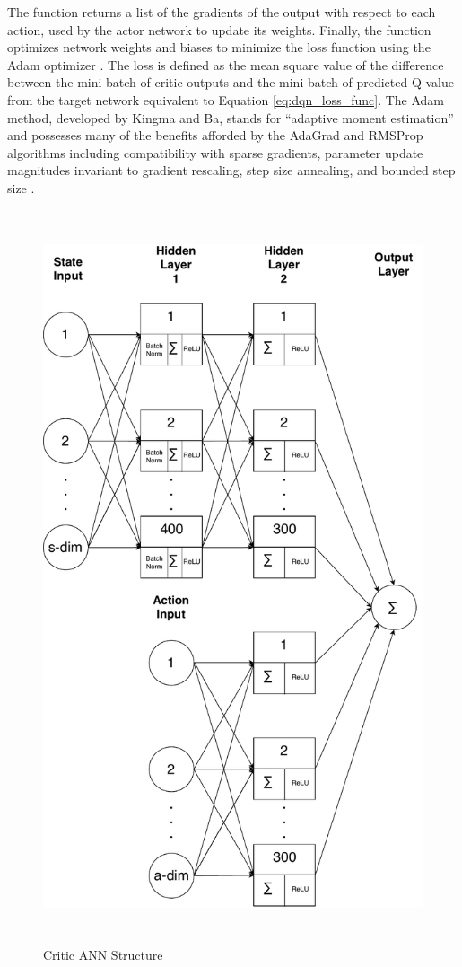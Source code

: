 The  function returns a list of the gradients of the output with respect to each action, used by the actor network to update its weights. Finally, the  function optimizes network weights and biases to minimize the loss function using the Adam optimizer \cite{adam_opt}. The loss is defined as the mean square value of the difference between the mini-batch of critic outputs and the mini-batch of predicted Q-value from the target network equivalent to Equation \ref{eq:dqn_loss_func}. The Adam method, developed by Kingma and Ba, stands for ``adaptive moment estimation'' and possesses many of the benefits afforded by the AdaGrad and RMSProp algorithms including compatibility with sparse gradients, parameter update magnitudes invariant to gradient rescaling, step size annealing, and bounded step size \cite{duchi_2011}\cite{adam_opt}\cite{tieleman_2012}.
\begin{figure}[H]   %
	\centering \includegraphics[width=6in, height=8.5in, keepaspectratio]{figures/critic_net.pdf}
	\caption{Critic ANN Structure}\label{fig:critic_net}
\end{figure}


